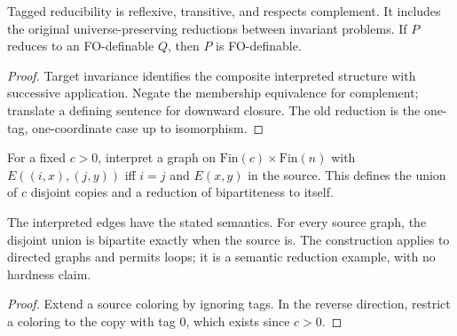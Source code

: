 \begin{theorem}
  \label{thm:desc-tagged-reduction}
  \leanok
  Tagged reducibility is reflexive, transitive, and respects complement. It
  includes the original universe-preserving reductions between invariant
  problems. If $P$ reduces to an FO-definable $Q$, then $P$ is FO-definable.
\end{theorem}
\begin{proof}
  \leanok
  Target invariance identifies the composite interpreted structure with successive
  application. Negate the membership equivalence for complement; translate a
  defining sentence for downward closure. The old reduction is the one-tag,
  one-coordinate case up to isomorphism.
\end{proof}

\begin{definition}
  \label{def:desc-disjoint-copies}
  \leanok
  For a fixed $c>0$, interpret a graph on $\mathrm{Fin}(c)\times\mathrm{Fin}(n)$
  with $E((i,x),(j,y))$ iff $i=j$ and $E(x,y)$ in the source. This defines the
  union of $c$ disjoint copies and a reduction of bipartiteness to itself.
\end{definition}

\begin{theorem}
  \label{thm:desc-disjoint-copies}
  \leanok
  The interpreted edges have the stated semantics. For every source graph, the
  disjoint union is bipartite exactly when the source is. The construction applies
  to directed graphs and permits loops; it is a semantic reduction example,
  with no hardness claim.
\end{theorem}
\begin{proof}
  \leanok
  Extend a source coloring by ignoring tags. In the reverse direction, restrict
  a coloring to the copy with tag $0$, which exists since $c>0$.
\end{proof}

